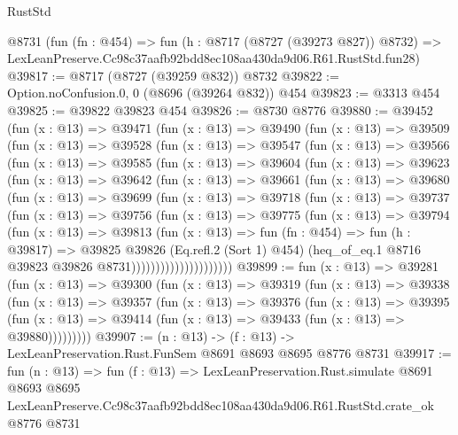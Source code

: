 \begin{lexlean}{RustStd}
\begin{coremodule}
    @8731
    (fun (fn : @454) =>
    fun (h : @8717 (@8727 (@39273 @827)) @8732) =>
    LexLeanPreserve.Cc98c37aafb92bdd8ec108aa430da9d06.R61.RustStd.fun28)
@39817 := @8717 (@8727 (@39259 @832)) @8732
@39822 := Option.noConfusion.{0, 0} (@8696 (@39264 @832)) @454
@39823 := @3313 @454
@39825 := @39822 @39823 @454
@39826 := @8730 @8776
@39880 := @39452
    (fun (x : @13) =>
    @39471
      (fun (x : @13) =>
      @39490
        (fun (x : @13) =>
        @39509
          (fun (x : @13) =>
          @39528
            (fun (x : @13) =>
            @39547
              (fun (x : @13) =>
              @39566
                (fun (x : @13) =>
                @39585
                  (fun (x : @13) =>
                  @39604
                    (fun (x : @13) =>
                    @39623
                      (fun (x : @13) =>
                      @39642
                        (fun (x : @13) =>
                        @39661
                          (fun (x : @13) =>
                          @39680
                            (fun (x : @13) =>
                            @39699
                              (fun (x : @13) =>
                              @39718
                                (fun (x : @13) =>
                                @39737
                                  (fun (x : @13) =>
                                  @39756
                                    (fun (x : @13) =>
                                    @39775
                                      (fun (x : @13) =>
                                      @39794
                                        (fun (x : @13) =>
                                        @39813
                                          (fun (x : @13) =>
                                          fun (fn : @454) =>
                                          fun (h : @39817) =>
                                          @39825
                                            @39826
                                            (Eq.refl.{2} (Sort 1) @454)
                                            (heq_of_eq.{1}
                                              @8716
                                              @39823
                                              @39826
                                              @8731)))))))))))))))))))))
@39899 := fun (x : @13) =>
  @39281
    (fun (x : @13) =>
    @39300
      (fun (x : @13) =>
      @39319
        (fun (x : @13) =>
        @39338
          (fun (x : @13) =>
          @39357
            (fun (x : @13) =>
            @39376
              (fun (x : @13) =>
              @39395
                (fun (x : @13) => @39414 (fun (x : @13) => @39433 (fun (x : @13) => @39880)))))))))
@39907 := (n : @13) -> (f : @13) -> LexLeanPreservation.Rust.FunSem @8691 @8693 @8695 @8776 @8731
@39917 := fun (n : @13) =>
  fun (f : @13) =>
  LexLeanPreservation.Rust.simulate
    @8691
    @8693
    @8695
    LexLeanPreserve.Cc98c37aafb92bdd8ec108aa430da9d06.R61.RustStd.crate_ok
    @8776
    @8731
\end{coremodule}
\end{lexlean}
